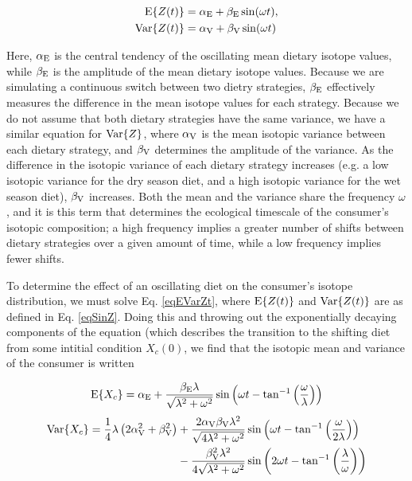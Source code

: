 \documentclass{frontiersSCNS}
\begin{document}
\begin{align}
  \begin{split}
    \label{eqSinZ}
    {\rm E}\{Z(t)\} &= \alpha_{\rm E} + \beta_{\rm E}\sin(\omega t), \\
    {\rm Var}\{Z(t)\} &= \alpha_{\rm V} + \beta_{\rm V}\sin(\omega t)
  \end{split}
\end{align}

\noindent Here, $\alpha_{\rm E}$ is the central tendency of the oscillating mean dietary isotope values, while $\beta_{\rm E}$ is the amplitude of the mean dietary isotope values.
Because we are simulating a continuous switch between two dietry strategies, $\beta_{\rm E}$ effectively measures the difference in the mean isotope values for each strategy.
Because we do not assume that both dietary strategies have the same variance, we have a similar equation for ${\rm Var}\{Z\}$, where $\alpha_{\rm V}$ is the mean isotopic variance between each dietary strategy, and $\beta_{\rm V}$ determines the amplitude of the variance.
As the difference in the isotopic variance of each dietary strategy increases (e.g. a low isotopic variance for the dry season diet, and a high isotopic variance for the wet season diet), $\beta_{\rm V}$ increases.
Both the mean and the variance share the frequency $\omega$, and it is this term that determines the ecological timescale of the consumer's isotopic composition; a high frequency implies a greater number of shifts between dietary strategies over a given amount of time, while a low frequency implies fewer shifts.

To determine the effect of an oscillating diet on the consumer's isotope distribution, we must solve Eq. \ref{eqEVarZt}, where ${\rm E}\{Z(t)\}$ and ${\rm Var}\{Z(t)\}$ are as defined in Eq. \ref{eqSinZ}.
Doing this and throwing out the exponentially decaying components of the equation (which describes the transition to the shifting diet from some intitial condition $X_c(0)$, we find that the isotopic mean and variance of the consumer is written

\begin{equation}
\label{EX-sin}
{\rm E}\{X_c\} = \alpha_{\rm E} + \frac{\beta_{\rm E} \lambda}{\sqrt{\lambda^2+\omega^2}} \sin{\left(\omega t - \tan^{-1}{\left(\frac{\omega}{\lambda}\right)}\right)}
\end{equation}
\begin{align}
\label{VX-sin}
{\rm Var}\{X_c\} = \frac{1}{4}\lambda\left(2 \alpha_{\rm V}^2 + \beta_{\rm V}^2\right) &+ \frac{2 \alpha_{\rm V} \beta_{\rm V} \lambda^2}{\sqrt{4\lambda^2+\omega^2}} \sin{\left(\omega t - \tan^{-1}{\left(\frac{\omega}{2\lambda}\right)}\right)} \nonumber \\ &- \frac{\beta_{\rm V}^2\lambda^2}{4\sqrt{\lambda^2+\omega^2}} \sin{\left(2 \omega t - \tan^{-1}{\left(\frac{\lambda}{\omega}\right)}\right)}
\end{align}
\end{document}
